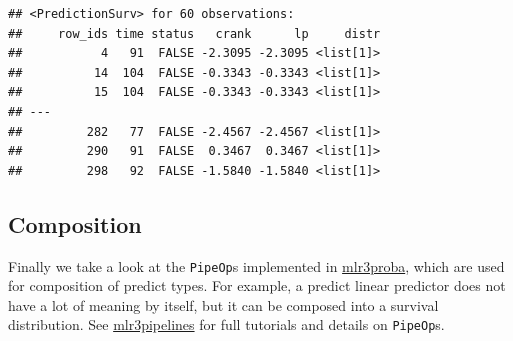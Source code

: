 \documentclass[
]{scrbook}
\newenvironment{Shaded}{\begin{snugshade}}{\end{snugshade}}
\newcommand{\AttributeTok}[1]{\textcolor[rgb]{0.77,0.63,0.00}{#1}}
\newcommand{\FloatTok}[1]{\textcolor[rgb]{0.00,0.00,0.81}{#1}}
\newcommand{\FunctionTok}[1]{\textcolor[rgb]{0.00,0.00,0.00}{#1}}
\newcommand{\NormalTok}[1]{#1}
\newcommand{\OtherTok}[1]{\textcolor[rgb]{0.56,0.35,0.01}{#1}}
\newcommand{\SpecialCharTok}[1]{\textcolor[rgb]{0.00,0.00,0.00}{#1}}
\newcommand{\StringTok}[1]{\textcolor[rgb]{0.31,0.60,0.02}{#1}}
\renewenvironment{Shaded} {\begin{snugshade}\small} {\end{snugshade}}
\begin{document}
\begin{Shaded}
\end{Shaded}

\begin{verbatim}
## <PredictionSurv> for 60 observations:
##     row_ids time status   crank      lp     distr
##           4   91  FALSE -2.3095 -2.3095 <list[1]>
##          14  104  FALSE -0.3343 -0.3343 <list[1]>
##          15  104  FALSE -0.3343 -0.3343 <list[1]>
## ---                                              
##         282   77  FALSE -2.4567 -2.4567 <list[1]>
##         290   91  FALSE  0.3467  0.3467 <list[1]>
##         298   92  FALSE -1.5840 -1.5840 <list[1]>
\end{verbatim}

\hypertarget{composition}{%
\subsection{Composition}\label{composition}}

Finally we take a look at the \texttt{PipeOp}s implemented in \href{https://mlr3proba.mlr-org.com}{mlr3proba}, which are used for composition of predict types.
For example, a predict linear predictor does not have a lot of meaning by itself, but it can be composed into a survival distribution.
See \href{https://mlr3pipelines.mlr-org.com}{mlr3pipelines} for full tutorials and details on \texttt{PipeOp}s.
\end{document}
